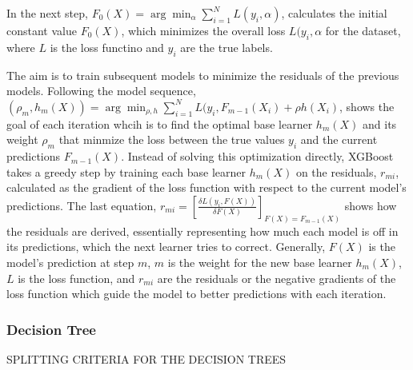 \documentclass[12pt, a4paper,twoside]{report}
\numberwithin{equation}{chapter}
\begin{document}
In the next step, \(F_0(X) = \arg \min_{\alpha} \sum_{i=1}^{N} L(y_i, \alpha)\), calculates the initial constant value \(F_0(X)\), which minimizes the overall loss \(L(y_i, \alpha\) for the dataset, where \(L\) is the loss functino and \(y_i\) are the true labels.

The aim is to train subsequent models to minimize the residuals of the previous models. Following the model sequence, \((\rho_m, h_m(X)) = \arg\min_{\rho, h} \sum_{i=1}^{N} L(y_i, F_{m-1}(X_i) + \rho h(X_i)\), shows the goal of each iteration whcih is to find the optimal base learner \(h_m(X)\) and its weight \(\rho_m\) that minmize the loss between the true values \(y_i\) and the current predictions \(F_{m-1}(X)\). Instead of solving this optimization directly, XGBoost takes a greedy step by training each base learner \(h_m(X)\) on the residuals, \(r_{mi}\), calculated as the gradient of the loss function with respect to the current model's predictions. The last equation, \(r_{mi} = [\frac{\delta L (y_i, F(X))}{\delta F(X)}]_{F(X)=F_{m-1}(X)}\) shows how the residuals are derived, essentially representing how much each model is off in its predictions, which the next learner tries to correct. Generally, \(F(X)\) is the model's prediction at step \(m\), \(m\)  is the weight for the new base learner \(h_m(X)\), \(L\) is the loss function, and \(r_{mi}\) are the residuals or the negative gradients of the loss function which guide the model to better predictions with each iteration.



\subsubsection{Decision Tree}

SPLITTING CRITERIA FOR THE DECISION TREES
\end{document}
